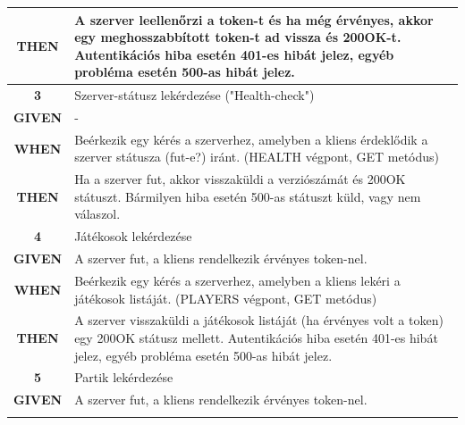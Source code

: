 \documentclass[twoside, a4paper, 12pt]{article}
\begin{document}
\begin{longtable}[c]{|c|p{14cm}|}
	\textbf{THEN} &
	A szerver leellenőrzi a token-t és ha még érvényes, akkor egy meghosszabbított token-t ad vissza és 200OK-t.
	Autentikációs hiba esetén 401-es hibát jelez, egyéb probléma esetén 500-as hibát jelez.
	\\
	\hline
	
	\rowcolor[HTML]{CBCEFB} 
	\textbf{3}
	&	Szerver-státusz lekérdezése ("Health-check")
	\\ \nobreakhline
	
	\textbf{GIVEN} &
	-
	\\ \nobreakhline
	
	\textbf{WHEN} &
	Beérkezik egy kérés a szerverhez, amelyben a kliens érdeklődik a szerver státusza (fut-e?) iránt.
	(HEALTH végpont, GET metódus)
	\\
	\nobreakhline
	
	\textbf{THEN} &
	Ha a szerver fut, akkor visszaküldi a verziószámát és 200OK státuszt.
	Bármilyen hiba esetén 500-as státuszt küld, vagy nem válaszol.
	\\
	\hline
	
	\rowcolor[HTML]{CBCEFB} 
	\textbf{4}
	&	Játékosok lekérdezése
	\\ \nobreakhline
	
	\textbf{GIVEN} &
	A szerver fut, a kliens rendelkezik érvényes token-nel.
	\\ \nobreakhline
	
	\textbf{WHEN} &
	Beérkezik egy kérés a szerverhez, amelyben a kliens lekéri a játékosok listáját.
	(PLAYERS végpont, GET metódus)
	\\
	\nobreakhline
	
	\textbf{THEN} &
	A szerver visszaküldi a játékosok listáját (ha érvényes volt a token) egy 200OK státusz mellett.
	Autentikációs hiba esetén 401-es hibát jelez, egyéb probléma esetén 500-as hibát jelez.
	\\
	\hline
	
	\rowcolor[HTML]{CBCEFB} 
	\textbf{5}
	&	Partik lekérdezése
	\\ \nobreakhline
	
	\textbf{GIVEN} &
	A szerver fut, a kliens rendelkezik érvényes token-nel.
	\\ \nobreakhline
	

\end{longtable}
\end{document}
